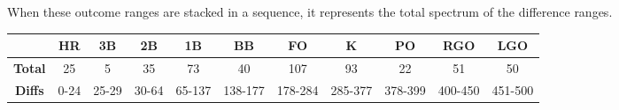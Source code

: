 When these outcome ranges are stacked in a sequence, it represents the total spectrum of the difference ranges.

\begin{center}
	\begin{tabular}{|c|c|c|c|c|c|c|c|c|c|c|}
		\hline 
		               & HR   & 3B    & 2B    & 1B     & BB      & FO      & K       & PO      & RGO     & LGO     \\
		\hline 
		\textbf{Total} & 25   & 5     & 35    & 73     & 40      & 107     & 93      & 22      & 51      & 50      \\
		\hline 
		\textbf{Diffs} & 0-24 & 25-29 & 30-64 & 65-137 & 138-177 & 178-284 & 285-377 & 378-399 & 400-450 & 451-500 \\
		\hline
	\end{tabular}
\end{center}

